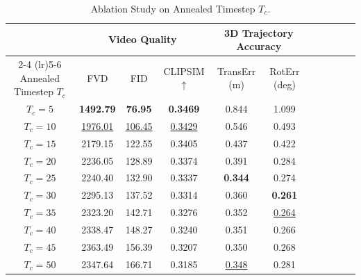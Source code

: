 \begin{table}[!ht]

\caption{Ablation Study on Annealed Timestep $T_c$.}
\label{tab:ablation_annealed_tc}

\centering
\begin{threeparttable}

\resizebox{0.85\textwidth}{!} 
{
\begin{tabular}{ccccccccccc}
\toprule
&  \multicolumn{3}{c}{ Video Quality } & \multicolumn{2}{c}{ 3D Trajectory Accuracy } \\
\cmidrule(lr){2-4} 
\cmidrule(lr){5-6} 
Annealed Timestep $T_c$ & FVD  & FID  & CLIPSIM $\uparrow$ & TransErr (m)  & RotErr (deg)  \\

\midrule
$T_{c}=5$ & \textbf{1492.79} & \textbf{76.95} & \textbf{0.3469} & 0.844 & 1.099 \\
$T_{c}=10$ & \underline{1976.01} & \underline{106.45} & \underline{0.3429} & 0.546 & 0.493  \\
$T_{c}=15$ & 2179.15 & 122.55 & 0.3405 & 0.437 & 0.422 \\
$T_{c}=20$ & 2236.05 & 128.89 & 0.3374 & 0.391 & 0.284 \\
$T_{c}=25$ & 2240.40 & 132.90 & 0.3337 & \textbf{0.344} & 0.274 \\
$T_{c}=30$ & 2295.13 & 137.52 & 0.3314 & 0.360 & \textbf{0.261} \\
$T_{c}=35$ & 2323.20 & 142.71 & 0.3276 & 0.352 & \underline{0.264} \\
$T_{c}=40$ & 2338.47 & 148.27 & 0.3240 & 0.351 & 0.266 \\
$T_{c}=45$ & 2363.49 & 156.39 & 0.3207 & 0.350 & 0.268 \\
$T_{c}=50$ & 2347.64 & 166.71 & 0.3185 & \underline{0.348} & 0.281 \\

\bottomrule

\end{tabular}
} 
\end{threeparttable}
\end{table}
